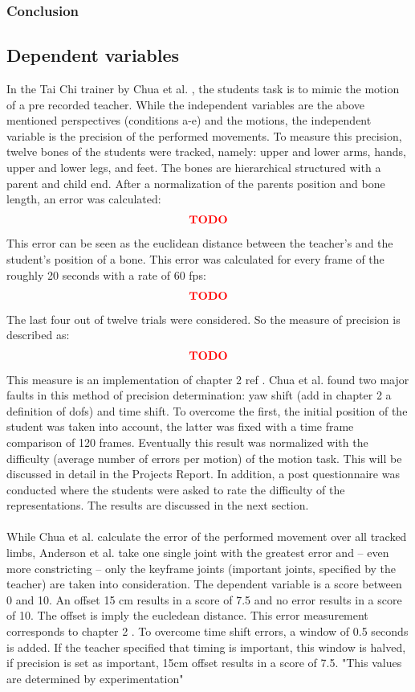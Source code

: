 \subsubsection{Conclusion}

\subsection{Dependent variables}
In the Tai Chi trainer by Chua et al. \cite{Chua}, the students task is to mimic the motion of a pre recorded teacher. While the independent variables are the above mentioned perspectives (conditions a-e) and the motions, the independent variable is the precision of the performed movements. To measure this precision, twelve bones of the students were tracked, namely: upper and lower arms, hands, upper and lower legs, and feet. The bones are hierarchical structured with a parent and child end. After a normalization of the parents position and bone length, an error was calculated:
\begin{equation}
	\textcolor{red}{\textbf{TODO}}
\end{equation}
This error can be seen as the euclidean distance between the teacher's and the student's position of a bone. This error was calculated for every frame of the roughly 20 seconds with a rate of 60 fps:
\begin{equation}
	\textcolor{red}{\textbf{TODO}}
\end{equation}
The last four out of twelve trials were considered. So the measure of precision is described as:
\begin{equation}
	\textcolor{red}{\textbf{TODO}}
\end{equation}
This measure is an implementation of chapter 2 ref \todo.
Chua et al. found two major faults in this method of precision determination: yaw shift (\todo add in chapter 2 a definition of dofs) and time shift. To overcome the first, the initial position of the student was taken into account, the latter was fixed with a time frame comparison of 120 frames. Eventually this result was normalized with the difficulty (average number of errors per motion) of the motion task. This will be discussed in detail in the Projects Report. In addition, a post questionnaire was conducted where the students were asked to rate the difficulty of the representations. The results are discussed in the next section.\\ \\
While Chua et al. calculate the error of the performed movement over all tracked limbs, Anderson et al. take one single joint with the greatest error and \--- even more constricting \--- only the keyframe joints (important joints, specified by the teacher) are taken into consideration. The dependent variable is a score between 0 and 10. An offset 15 cm results in a score of 7.5 and no error results in a score of 10. The offset is imply the eucledean distance. This error measurement corresponds to chapter 2 \todo. To overcome time shift errors, a window of 0.5 seconds is added. If the teacher specified that timing is important, this window is halved, if precision is set as important, 15cm offset results in a score of 7.5. "This values are determined by experimentation"
